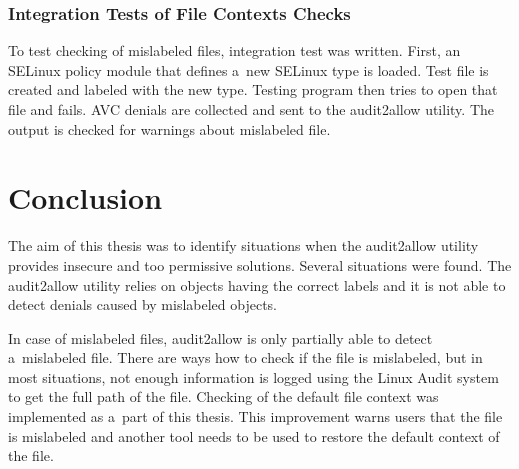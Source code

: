 \subsection{Integration Tests of File Contexts Checks}
To test checking of mislabeled files, integration test was written. First,
an SELinux policy module that defines a~new SELinux type is loaded. Test file is
created and labeled with the new type. Testing program then tries to open that
file and fails. AVC denials are collected and sent to the audit2allow utility.
The output is checked for warnings about mislabeled file.

\chapter{Conclusion}


The aim of this thesis was to identify situations when the audit2allow utility
provides insecure and too permissive solutions. Several situations were found.
The audit2allow utility relies on objects having the correct labels and it is
not able to detect denials caused by mislabeled objects.

In case of mislabeled files, audit2allow is only partially able to detect
a~mislabeled file. There are ways how to check if the file is mislabeled, but in
most situations, not enough information is logged using the Linux Audit system
to get the full path of the file. Checking of the default file context was
implemented as a~part of this thesis. This improvement warns users that the file
is mislabeled and another tool needs to be used to restore the default context
of the file.

